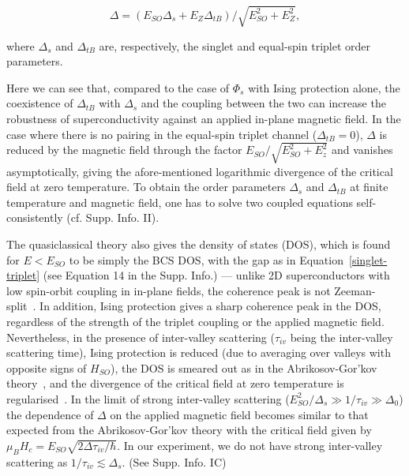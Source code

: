 \documentclass[showpacs,superscriptaddress,preprint,prb]{revtex4}
\begin{document}
\begin{equation} \label{singlet-triplet}
\Delta= (E_{SO}\Delta_{s}+ E_Z  \Delta_{tB})/\sqrt{E_{SO}^2+E_{Z}^2},
\end{equation} 

\noindent where $\Delta_{s}$ and $\Delta_{tB}$ are, respectively, the singlet and equal-spin triplet order parameters. 

Here we can see that, compared to the case of $\Phi_{s}$ with Ising protection alone, the coexistence of $\Delta_{tB}$  with $\Delta_{s}$ and the coupling between the two can increase the robustness of superconductivity against an applied in-plane magnetic field. In the case where there is no pairing in the equal-spin triplet channel ($\Delta_{tB} = 0$), $\Delta$ is reduced by the magnetic field through the factor $E_{SO}/\sqrt{E_{SO}^2+E_{z}^2}$ and vanishes asymptotically, giving the afore-mentioned logarithmic divergence of the critical field at zero temperature. To obtain the order parameters $\Delta_{s}$ and $\Delta_{tB}$ at finite temperature and magnetic field, one has to solve two coupled equations self-consistently (cf. Supp. Info. II). 

The quasiclassical theory also gives the density of states (DOS), which is found for $E<E_{SO}$ to be simply the BCS DOS, with the gap as in Equation~\ref{singlet-triplet} (see Equation 14 in the Supp. Info.) --- unlike 2D superconductors with low spin-orbit coupling in in-plane fields, the coherence peak is not Zeeman-split~\cite{meservey1970}. In addition, Ising protection gives a sharp coherence peak in the DOS, regardless of the strength of the triplet coupling or the applied magnetic field. Nevertheless, in the presence of inter-valley scattering ($\tau_{iv}$ being the inter-valley scattering time), Ising protection is reduced (due to averaging over valleys with opposite signs of $H_{SO}$), the DOS is smeared out \cite{haim2020} as in the Abrikosov-Gor'kov theory~\cite{abrikosov,bruno1973}, and the divergence of the critical field at zero temperature is regularised~\cite{ilic2017}. In the limit of strong inter-valley scattering ($E_{SO}^2/\Delta_s \gg 1/\tau_{iv} \gg \Delta_0$) the dependence of $\Delta$ on the applied magnetic field becomes similar to that expected from the Abrikosov-Gor'kov theory with the critical field given by  $\mu_B H_c = E_{SO} \sqrt{2 \Delta \tau_{iv} /\hbar}$. In our experiment, we do not have strong inter-valley scattering as $1/\tau_{iv} \lesssim \Delta_s$. (See Supp. Info. IC)
\end{document}
